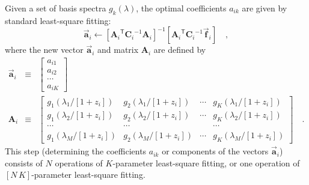 \documentclass[12pt]{article}
\newcommand{\inverse}[1]{{#1}^{-1}}
\newcommand{\transpose}[1]{{#1}^{\mathsf{T}}}
\newcommand{\hoggvector}[1]{\boldsymbol{\vec{#1}}}
\newcommand{\avec}{\hoggvector{a}}
\newcommand{\fvec}{\hoggvector{f}}
\newcommand{\hoggmatrix}[1]{\boldsymbol{#1}}
\newcommand{\Amatrix}{\hoggmatrix{A}}
\newcommand{\Cmatrix}{\hoggmatrix{C}}
\begin{document}
Given a set of basis spectra $g_k(\lambda)$, the optimal coefficients
$a_{ik}$ are given by standard least-square fitting:
\begin{equation}
\avec_i \leftarrow \inverse{\left[\transpose{\Amatrix_i} \inverse{\Cmatrix_i} \Amatrix_i\right]}
 \left[\transpose{\Amatrix_i} \inverse{\Cmatrix_i} \fvec_i\right]
\quad ,
\end{equation}
where the new vector $\avec_i$ and matrix $\Amatrix_i$ are defined by
\begin{eqnarray}
\avec_i & \equiv &
 \left[\begin{array}{c} a_{i1} \\
                        a_{i2} \\
                        \cdots \\
                        a_{iK} \end{array}\right] \nonumber\\
\Amatrix_i & \equiv &
 \left[\begin{array}{cccc}
  g_1(\lambda_1/[1+z_i]) & g_2(\lambda_1/[1+z_i]) & \cdots & g_K(\lambda_1/[1+z_i]) \\
  g_1(\lambda_2/[1+z_i]) & g_2(\lambda_2/[1+z_i]) & \cdots & g_K(\lambda_2/[1+z_i]) \\
  \cdots & \cdots & & \cdots \\
  g_1(\lambda_M/[1+z_i]) & g_2(\lambda_M/[1+z_i]) & \cdots & g_K(\lambda_M/[1+z_i])
 \end{array}\right]
\quad .
\end{eqnarray}
This step (determining the coefficients $a_{ik}$ or components of the
vectors $\avec_i$) consists of $N$ operations of $K$-parameter
least-square fitting, or one operation of $[N\,K]$-parameter
least-square fitting.
\end{document}
